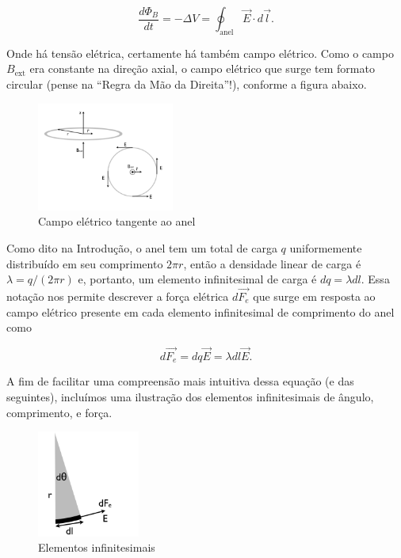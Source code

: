 \documentclass[
	article,
	11pt,
	oneside,
	a4paper,
	english,
	brazil,
	sumario=tradicional
	]{abntex2}
\begin{document}
\begin{equation}
	\frac{d\Phi_B}{dt} = -\Delta V = \oint_{\text{anel}} \vec{E} \cdot d\vec{l}.
\end{equation}


Onde há tensão elétrica, certamente há também campo elétrico. Como o campo $B_{\text{ext}}$ era constante na direção axial, o campo elétrico que surge tem formato circular (pense na ``Regra da Mão da Direita''!), conforme a figura abaixo.

\begin{figure}[htb]\label{campo-tangencial-img}
    \caption{Campo elétrico tangente ao anel}
    \centering
    \includegraphics[width=0.4\textwidth]{corrente_tangencial.png}
\end{figure}

Como dito na Introdução, o anel tem um total de carga $q$ uniformemente distribuído em seu comprimento $2\pi r$, então a densidade linear de carga é $\lambda = q/(2\pi r)$ e, portanto, um elemento infinitesimal de carga é $dq = \lambda dl$. Essa notação nos permite descrever a força elétrica $d \vec{F_e}$ que surge em resposta ao campo elétrico presente em cada elemento infinitesimal de comprimento do anel como

\begin{equation} \label{lei-de-faraday-eq}
    d \vec{F_e} = dq \vec{E} = \lambda dl \vec{E}.
\end{equation}

A fim de facilitar uma compreensão mais intuitiva dessa equação (e das seguintes), incluímos uma ilustração dos elementos infinitesimais de ângulo, comprimento, e força.

\begin{figure}[htb]\label{elementos-infinitesimais-img}
    \caption{Elementos infinitesimais}
    \centering
    \includegraphics[width=0.3\textwidth]{elementos_infinitesimais.png}
\end{figure}
\end{document}
